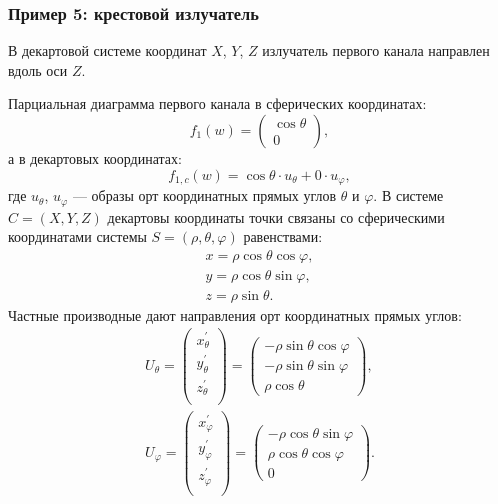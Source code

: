 \subsubsection{Пример 5: крестовой излучатель}

В декартовой системе координат $X$, $Y$, $Z$ излучатель первого канала направлен вдоль оси $Z$.

Парциальная диаграмма первого канала в сферических координатах:
\[
    f_1(w) =
    \begin{pmatrix}
        \cos \theta \\
        0
    \end{pmatrix} ,
\]
а в декартовых координатах:
\[
    f_{1,c}(w) = \cos \theta \cdot u_{\theta} + 0 \cdot u_{\varphi} ,
\]
где $u_\theta$, $u_\varphi$ --- образы орт координатных прямых углов $\theta$ и $\varphi$. В системе $C = (X, Y, Z)$ декартовы координаты точки связаны со сферическими
координатами системы $S = (\rho, \theta, \varphi)$ равенствами:
\begin{gather*}
    x = \rho \cos \theta \cos \varphi, \\
    y = \rho \cos \theta \sin \varphi, \\
    z = \rho \sin \theta.
\end{gather*}
Частные производные дают направления орт координатных прямых углов:
\begin{gather*}
    U_{\theta} =
    \begin{pmatrix}
        x_{\theta}^{\prime} \\
        y_{\theta}^{\prime} \\
        z_{\theta}^{\prime} \\
    \end{pmatrix}
    =
    \begin{pmatrix}
        - \rho \sin \theta \cos \varphi \\
        - \rho \sin \theta \sin \varphi \\
        \rho \cos \theta
    \end{pmatrix}, \\
%
    U_{\varphi} =
    \begin{pmatrix}
        x_{\varphi}^{\prime} \\
        y_{\varphi}^{\prime} \\
        z_{\varphi}^{\prime} \\
    \end{pmatrix}
    =
    \begin{pmatrix}
        - \rho \cos \theta \sin \varphi \\
        \rho \cos \theta \cos \varphi   \\
        0
    \end{pmatrix}.
\end{gather*}
